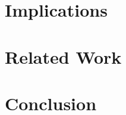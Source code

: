 \documentclass[runningheads,a4paper]{doc/llncs}
\begin{document}
\section{Implications}\label{seq:impl}

\section{Related Work}\label{seq:related}

\section{Conclusion}\label{seq:conclusion}


{}





\end{document}
